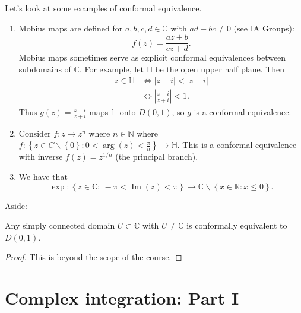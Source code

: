 \documentclass[egregdoesnotlikesansseriftitles,a4paper]{scrartcl}
\begin{document}
\begin{example*}
     Let's look at some examples of conformal equivalence.
      \begin{enumerate}
           \item Mobius maps are defined for $a,b,c,d \in \mathbb{C}$ with $ad-bc \neq 0$ (see IA Groups): \[
           f (z)= \frac{az+b}{cz+d}
           .\] Mobius maps sometimes serve as explicit conformal equivalences between subdomains of $\mathbb{C}$. For example, let $\mathbb{H}$ be the open upper half plane. Then 
           \begin{align*}
                z \in \mathbb{H} &\iff |z-i| < |z+i|\\
                & \iff | \frac{z-i}{z+i}|<1.
           \end{align*}
           Thus $g (z)=\frac{z-i}{z+i}$ maps $\mathbb{H}$ onto $D (0,1)$, so $g$ is a conformal equivalence.
           \item Consider $f: z \rightarrow z^{n}$ where $n \in \mathbb{N}$ where $f: \left\{z \in C \backslash \left\{0\right\}: 0 < \operatorname{arg}(z) < \frac{\pi}{n}\right\} \rightarrow \mathbb{H}$. This is a conformal equivalence with inverse $f (z)=z^{1/n}$ (the principal branch).
           \item We have that \[
           \operatorname{exp}: \left\{z \in \mathbb{C}: \ -\pi < \operatorname{Im}(z)<\pi\right\} \rightarrow \mathbb{C} \backslash \left\{x \in \mathbb{R}: x \leq 0\right\}
           .\]  
      \end{enumerate}
\end{example*}
Aside:
\begin{theorem}
      Any simply connected domain $U \subset \mathbb{C}$ with $U \neq \mathbb{C}$ is conformally equivalent to $D (0,1)$.
\end{theorem}
\begin{proof}
      This is beyond the scope of the course.\footnotemark
\end{proof}
\section{Complex integration: Part I}
\end{document}
